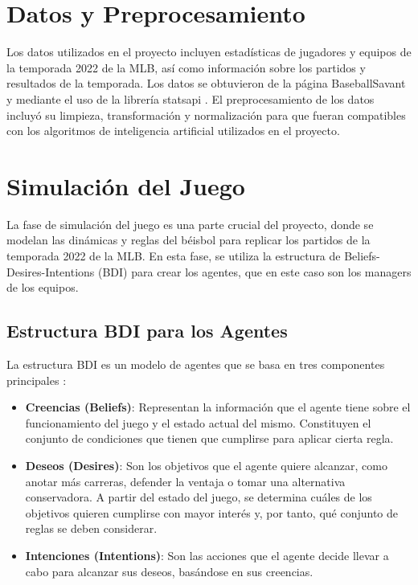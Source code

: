 \documentclass[runningheads]{llncs}
\begin{document}
\section{Datos y Preprocesamiento}
    Los datos utilizados en el proyecto incluyen estadísticas de jugadores y equipos de la temporada 2022 de la MLB, así como información sobre los partidos y resultados de la temporada. Los datos se obtuvieron de la página BaseballSavant \cite{baseballsavant} y mediante el uso de la librería statsapi \cite{statsapi}. El preprocesamiento de los datos incluyó su limpieza, transformación y normalización para que fueran compatibles con los algoritmos de inteligencia artificial utilizados en el proyecto.

\section{Simulación del Juego}
    La fase de simulación del juego es una parte crucial del proyecto, donde se modelan las dinámicas y reglas del béisbol para replicar los partidos de la temporada 2022 de la MLB. En esta fase, se utiliza la estructura de Beliefs-Desires-Intentions (BDI) para crear los agentes, que en este caso son los managers de los equipos.

    \subsection{Estructura BDI para los Agentes}
        La estructura BDI es un modelo de agentes que se basa en tres componentes principales \cite{rao1995bdi}:
        \begin{itemize}
            \item \textbf{Creencias (Beliefs)}: Representan la información que el agente tiene sobre el funcionamiento del juego y el estado actual del mismo. Constituyen el conjunto de condiciones que tienen que cumplirse para aplicar cierta regla.
            \item \textbf{Deseos (Desires)}: Son los objetivos que el agente quiere alcanzar, como anotar más carreras, defender la ventaja o tomar una alternativa conservadora. A partir del estado del juego, se determina cuáles de los objetivos quieren cumplirse con mayor interés y, por tanto, qué conjunto de reglas se deben considerar.
            \item \textbf{Intenciones (Intentions)}: Son las acciones que el agente decide llevar a cabo para alcanzar sus deseos, basándose en sus creencias.
        \end{itemize}
\end{document}
